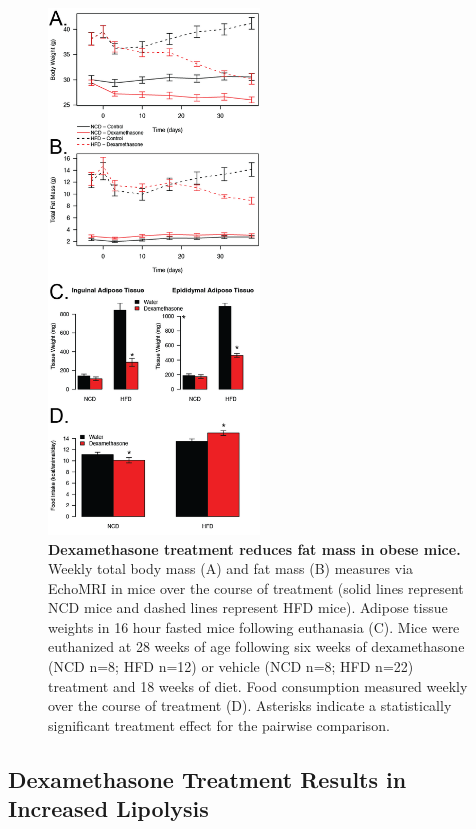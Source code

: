 \documentclass[11pt]{article} %
\begin{document}
\begin{figure}
  \begin{center}
    \includegraphics[width=0.5\textwidth]{Figures_Figure_3.png}
  \end{center}
  \caption{\textbf{Dexamethasone treatment reduces fat mass in obese
mice. }  Weekly total body mass (A) and fat mass (B) measures via EchoMRI in mice
over the course of treatment (solid lines represent NCD mice and dashed
lines represent HFD mice). Adipose tissue weights in 16 hour fasted mice
following euthanasia (C). Mice were euthanized at 28 weeks of age
following six weeks of dexamethasone (NCD n=8; HFD n=12) or vehicle (NCD
n=8; HFD n=22) treatment and 18 weeks of diet. Food consumption measured
weekly over the course of treatment (D). Asterisks indicate a
statistically significant treatment effect for the pairwise comparison.}
 \label{fig:3}
\end{figure}

\subsection*{Dexamethasone Treatment Results in Increased Lipolysis}
\end{document}
